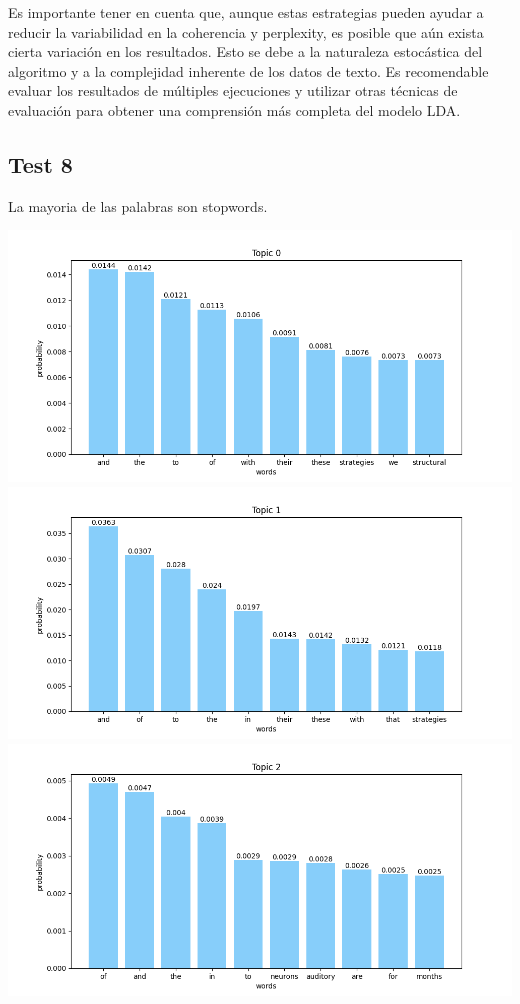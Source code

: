\documentclass[10pt]{article} %
\begin{document}
	Es importante tener en cuenta que, aunque estas estrategias pueden ayudar a reducir la variabilidad en la coherencia y perplexity, es posible que aún exista cierta variación en los resultados. Esto se debe a la naturaleza estocástica del algoritmo y a la complejidad inherente de los datos de texto. Es recomendable evaluar los resultados de múltiples ejecuciones y utilizar otras técnicas de evaluación para obtener una comprensión más completa del modelo LDA.
	
	\subsection{Test 8}
	
	La mayoria de las palabras son stopwords.
	
	\begin{center}
		\includegraphics[scale=0.6]{images/plots/test_8/topic_0.png}
		\includegraphics[scale=0.6]{images/plots/test_8/topic_1.png}
		\includegraphics[scale=0.6]{images/plots/test_8/topic_2.png}

\end{center}
\end{document}
